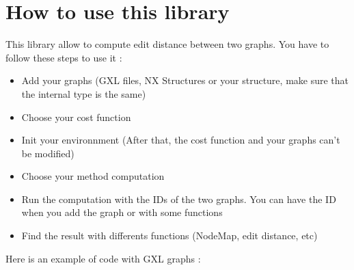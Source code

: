 \documentclass[letterpaper,10pt,english]{sphinxmanual}
\begin{document}
\section{How to use this library}
\label{readme:how-to-use-this-library}
This library allow to compute edit distance between two graphs. You have to follow these steps to use it :
\begin{itemize}
\item {} 
Add your graphs (GXL files, NX Structures or your structure, make sure that the internal type is the same)

\item {} 
Choose your cost function

\item {} 
Init your environnment (After that, the cost function and your graphs can't be modified)

\item {} 
Choose your method computation

\item {} 
Run the computation with the IDs of the two graphs. You can have the ID when you add the graph or with some functions

\item {} 
Find the result with differents functions (NodeMap, edit distance, etc)

\end{itemize}

Here is an example of code with GXL graphs :
\end{document}
